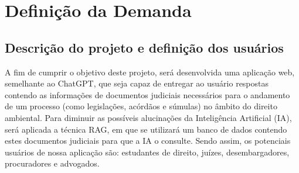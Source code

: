 \documentclass[
	12pt,				%
	openright,			%
	oneside,			    %
	a4paper,				%
	english,			%
	french,			%
	spanish,			%
	brazil			%
	]{abntex2}
\begin{document}
\chapter{Definição da Demanda}

\section{Descrição do projeto e definição dos usuários}

A fim de cumprir o objetivo deste projeto, será desenvolvida uma aplicação web, semelhante ao ChatGPT, que seja capaz de entregar ao usuário respostas contendo as informações de documentos judiciais necessários para o andamento de um processo (como legislações, acórdãos e súmulas) no âmbito do direito ambiental. Para diminuir as possíveis alucinações da Inteligência Artificial (IA), será aplicada a técnica RAG, em que se utilizará um banco de dados contendo estes documentos judiciais para que a IA o consulte. Sendo assim, os potenciais usuários de nossa aplicação são: estudantes de direito, juízes, desembargadores, procuradores e advogados.
\end{document}
